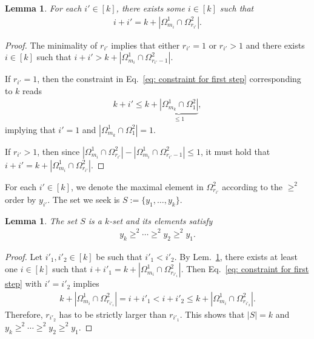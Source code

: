 \documentclass[12pt]{article}
\newtheorem{lem}[thm]{Lemma}
\theoremstyle{definition}
\numberwithin{equation}{section}
\numberwithin{equation}{section}
\newcommand{\Og}{\Omega}
\begin{document}
\begin{lem}
\label{lem: minimality implies equalities}
For each \(i' \in [k]\), there exists some \(i \in [k]\) such that 
\begin{gather}
i + i' = k + | \Og^1_{m_i} \cap \Og^2_{r_{i'}}|.
\end{gather}
\end{lem}
\begin{proof}
The minimality of \(r_{i'}\) implies that either \(r_{i'} = 1\) or \(r_{i'} > 1\) and there exists \(i \in [k]\) such that \(i + i' > k + | \Og^1_{m_i} \cap \Og^2_{r_{i'}-1}|\). 

If \(r_{i'} = 1\), then the constraint in Eq.~\ref{eq: constraint for first step} corresponding to \(k\) reads 
\begin{gather}
k + i' \leq k + \underbrace{| \Og^1_{m_k} \cap \Og^2_{1}|}_{\leq 1}, 
\end{gather}
implying that \(i' = 1\) and \(| \Og^1_{m_k} \cap \Og^2_{1}| = 1\). 

If \(r_{i'} > 1\), then since \(| \Og^1_{m_i} \cap \Og^2_{r_{i'}}| - | \Og^1_{m_i} \cap \Og^2_{r_{i'}-1}| \leq 1\), it must hold that \(i + i' = k + | \Og^1_{m_i} \cap \Og^2_{r_{i'}}|\). \end{proof}


For each \(i' \in [k]\), we denote the maximal element in \(\Og_{r_{i'}}^2\) according to the \(\geq^2\) order by \(y_{i'}\). The set we seek is \(S:=\{ y_1, \ldots, y_k\}\). 
\begin{lem}
\label{lem: y's are distinct and monotonic}
The set \(S\) is a \(k\)-set and its elements satisfy \begin{gather}
y_k \geq^2 \cdots \geq^2 y_2 \geq^2 y_1.
\end{gather}
\end{lem}
\begin{proof}
Let \(i'_1, i'_2 \in [k]\) be such that \(i'_1 < i'_2\). By Lem.~\ref{lem: minimality implies equalities}, there exists at least one \(i \in [k]\) such that \(i + i'_1 = k + | \Og^1_{m_i} \cap \Og^2_{r_{i'_1}}|\). Then Eq.~\ref{eq: constraint for first step} with \(i' = i'_2\) implies
\begin{gather}
k + | \Og^1_{m_i} \cap \Og^2_{r_{i'_1}}| =  i + i'_1 < i + i'_2 \leq k+| \Og^1_{m_i} \cap \Og^2_{r_{i'_2}}|.  
\end{gather} 
Therefore, \(r_{i'_2}\) has to be strictly larger than \(r_{i'_1}\). This shows that \(|S| = k\) and \(y_k \geq^2 \cdots \geq^2 y_2 \geq^2 y_1\).
\end{proof}
\end{document}
